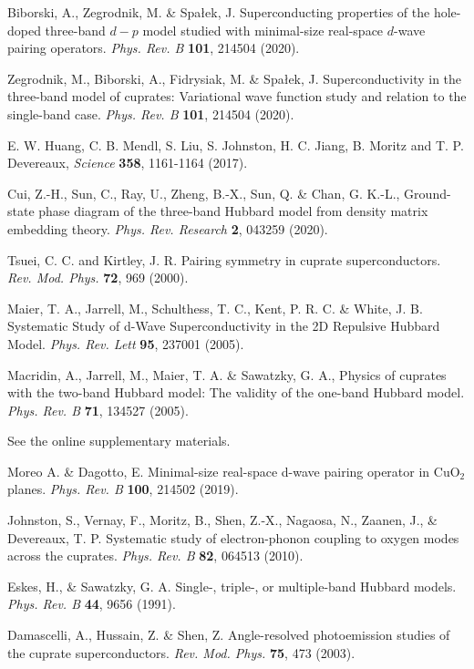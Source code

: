 \documentclass[fleqn,twocolumn,11pt]{wlscirep}
\begin{document}
\begin{thebibliography}{99}
 Biborski, A., Zegrodnik, M. \& Spałek, J. Superconducting properties of the hole-doped three-band $d-p$
 model studied with minimal-size real-space $d$-wave pairing operators. \textit{Phys. Rev. B} {\bf 101}, 214504 (2020).
 
 Zegrodnik, M., Biborski, A., Fidrysiak, M. \& Spałek, J. Superconductivity in the three-band model of cuprates: Variational wave function study and relation to the single-band case. \textit{Phys. Rev. B} {\bf 101}, 214504 (2020).

 E. W. Huang, C. B. Mendl, S. Liu, S. Johnston, H. C. Jiang, B. Moritz and T. P. Devereaux, \textit{Science} {\bf 358}, 1161-1164 (2017).

Cui, Z.-H., Sun, C., Ray, U., Zheng, B.-X., Sun, Q. \& Chan, G. K.-L.,   
Ground-state phase diagram of the three-band Hubbard model from density matrix embedding theory. 
\textit{Phys. Rev. Research} {\bf 2}, 043259 (2020).

Tsuei, C. C. and Kirtley, J. R. Pairing symmetry in cuprate superconductors. 
\textit{Rev. Mod. Phys.} {\bf 72}, 969 (2000).

 Maier,  T. A., Jarrell, M., Schulthess, T. C., Kent, P. R. C. \& White, J. B. Systematic Study of d-Wave Superconductivity in the 2D Repulsive Hubbard Model. \textit{Phys. Rev. Lett} {\bf 95}, 237001 (2005).
 
 Macridin, A.,  Jarrell, M.,  Maier, T. A. \& Sawatzky, G. A., Physics of cuprates with the two-band Hubbard model: The validity of the one-band Hubbard model. \textit{Phys. Rev. B} {\bf 71}, 134527 (2005).  

See the online supplementary materials.


 Moreo A. \&  Dagotto, E. Minimal-size real-space d-wave pairing operator in CuO$_2$ planes. \textit{Phys. Rev. B} {\bf 100}, 214502 (2019).

 Johnston, S., Vernay, F., Moritz, B., Shen, Z.-X., Nagaosa, N.,  Zaanen, J., \& Devereaux, T. P. Systematic study of electron-phonon coupling to oxygen modes across the cuprates.  \textit{Phys. Rev. B} {\bf 82}, 064513 (2010). 

 Eskes, H., \& Sawatzky, G. A. Single-, triple-, or multiple-band Hubbard models. \textit{Phys. Rev. B} {\bf 44}, 9656 (1991).


 Damascelli, A., Hussain, Z. \& Shen, Z. Angle-resolved photoemission studies of the cuprate superconductors. \textit{Rev. Mod. Phys.} {\bf 75}, 473 (2003).


\end{thebibliography}
\end{document}
